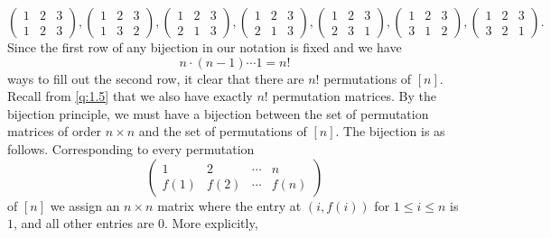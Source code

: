  \[
	 \begin{pmatrix} 1 & 2 & 3 \\ 1 & 2 & 3 \end{pmatrix}, \begin{pmatrix} 1 & 2 & 3 \\ 1 & 3 & 2 \end{pmatrix}, \begin{pmatrix} 1 & 2 & 3 \\ 2 & 1 & 3 \end{pmatrix}, \begin{pmatrix} 1 & 2 & 3 \\ 2 & 1 & 3 \end{pmatrix}, \begin{pmatrix} 1 & 2 & 3 \\ 2 & 3 & 1 \end{pmatrix}, \begin{pmatrix} 1 & 2 & 3 \\ 3 & 1 & 2\end{pmatrix}, \begin{pmatrix} 1 & 2 & 3 \\ 3 & 2 & 1 \end{pmatrix} 
.\]
Since the first row of any bijection in our notation is fixed and we have \[ n\cdot\left( n-1 \right) \cdots 1 = n!\] ways to fill out the second row, it clear that there are $n!$ permutations of $[n]$. Recall from \cref{q:1.5} that we also have exactly $n!$ permutation matrices. By the bijection principle, we must have a bijection between the set of permutation matrices of order $n\times n$ and the set of permutations of $[n]$. The bijection is as follows. Corresponding to every permutation \[
\begin{pmatrix} 
	1 & 2 & \cdots & n \\
	f\left(1\right) & f\left( 2 \right) & \cdots & f\left( n \right)
\end{pmatrix} 
\] of $[n]$ we assign an $n\times n$ matrix where the entry at $\left( i,f\left(i  \right)  \right)$ for $1\leq i\leq n$ is $1$, and all other entries are $0$. More explicitly,
